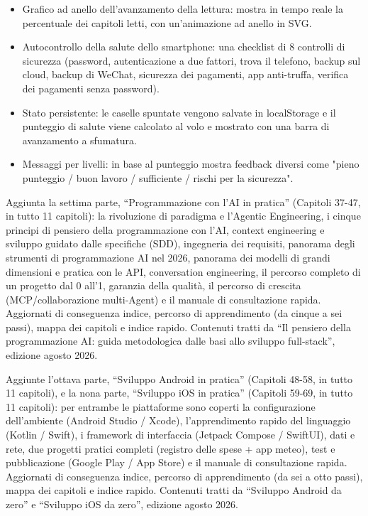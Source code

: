\begin{itemize}
  \item Grafico ad anello dell'avanzamento della lettura: mostra in tempo reale la percentuale dei capitoli letti, con un'animazione ad anello in SVG.
  \item Autocontrollo della salute dello smartphone: una checklist di 8 controlli di sicurezza (password, autenticazione a due fattori, trova il telefono, backup sul cloud, backup di WeChat, sicurezza dei pagamenti, app anti-truffa, verifica dei pagamenti senza password).
  \item Stato persistente: le caselle spuntate vengono salvate in localStorage e il punteggio di salute viene calcolato al volo e mostrato con una barra di avanzamento a sfumatura.
  \item Messaggi per livelli: in base al punteggio mostra feedback diversi come "pieno punteggio / buon lavoro / sufficiente / rischi per la sicurezza".
\end{itemize}


Aggiunta la settima parte, “Programmazione con l'AI in pratica” (Capitoli 37-47, in tutto 11 capitoli): la rivoluzione di paradigma e l'Agentic Engineering, i cinque principi di pensiero della programmazione con l'AI, context engineering e sviluppo guidato dalle specifiche (SDD), ingegneria dei requisiti, panorama degli strumenti di programmazione AI nel 2026, panorama dei modelli di grandi dimensioni e pratica con le API, conversation engineering, il percorso completo di un progetto dal 0 all'1, garanzia della qualità, il percorso di crescita (MCP/collaborazione multi-Agent) e il manuale di consultazione rapida. Aggiornati di conseguenza indice, percorso di apprendimento (da cinque a sei passi), mappa dei capitoli e indice rapido. Contenuti tratti da “Il pensiero della programmazione AI: guida metodologica dalle basi allo sviluppo full-stack”, edizione agosto 2026.

Aggiunte l'ottava parte, “Sviluppo Android in pratica” (Capitoli 48-58, in tutto 11 capitoli), e la nona parte, “Sviluppo iOS in pratica” (Capitoli 59-69, in tutto 11 capitoli): per entrambe le piattaforme sono coperti la configurazione dell'ambiente (Android Studio / Xcode), l'apprendimento rapido del linguaggio (Kotlin / Swift), i framework di interfaccia (Jetpack Compose / SwiftUI), dati e rete, due progetti pratici completi (registro delle spese + app meteo), test e pubblicazione (Google Play / App Store) e il manuale di consultazione rapida. Aggiornati di conseguenza indice, percorso di apprendimento (da sei a otto passi), mappa dei capitoli e indice rapido. Contenuti tratti da “Sviluppo Android da zero” e “Sviluppo iOS da zero”, edizione agosto 2026.

